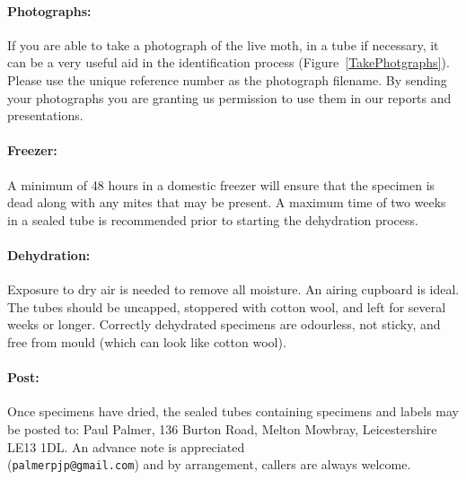 \documentclass[12pt]{article}
\begin{document}
	\paragraph{Photographs:} If you are able to take a photograph of the live moth, in a tube if necessary, it can be a very useful aid in the identification process (Figure~\ref{TakePhotgraphs}).  Please use the unique reference number as the photograph filename. By sending your photographs you are granting us permission to use them in our reports and presentations.
	

	
	\paragraph{Freezer:} A minimum of 48 hours in a domestic freezer will ensure that the specimen is dead along with any mites that may be present. A maximum time of two weeks in a sealed tube is recommended prior to starting the dehydration process.
	\paragraph{Dehydration:} Exposure to dry air is needed to remove all moisture. An airing cupboard is ideal. The tubes should be uncapped, stoppered with cotton wool, and left for several weeks or longer.  Correctly dehydrated specimens are odourless, not sticky, and free from mould (which can look like cotton wool).
	\paragraph{Post:} Once specimens have dried, the sealed tubes containing specimens and labels may be posted to: Paul Palmer, 136 Burton Road, Melton Mowbray, Leicestershire LE13 1DL. An advance note is appreciated \\ (\texttt{palmerpjp@gmail.com}) and by arrangement, callers are always welcome.
\end{document}
